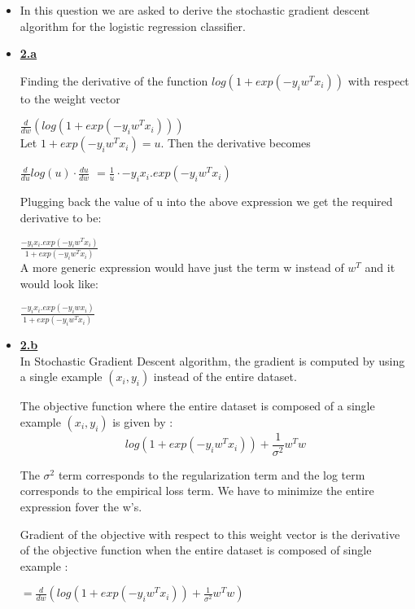 \documentclass[11pt]{article}
\begin{document}
\begin{itemize}
	\item [] In this question we are asked to derive the stochastic gradient descent algorithm for the logistic regression classifier.
	
	\item[] \textbf{\underline{2.a}}
	
	Finding the derivative of the function $log(1 + exp(-y_iw^Tx_i))$ with respect to the weight vector 
	
	$\frac{d}{dw}\left(log(1 + exp(-y_iw^Tx_i))\right)$\\
	
	Let $1 + exp(-y_iw^Tx_i) =u $. Then the derivative becomes
	
	$\frac{d}{du} log(u) \cdot \frac{du}{dw} $
	$=\frac{1}{u} \cdot -y_ix_i. exp(-y_iw^Tx_i)$
	
	Plugging back the value of u into the above expression we get the required derivative to be:
	
	$\boxed{\frac{-y_ix_i. exp(-y_iw^Tx_i)}{1 + exp(-y_iw^Tx_i)}}$\\
	
	A more generic expression would have just the term w instead of $w^T$ and it would look like:
	
		$\boxed{\frac{-y_ix_i. exp(-y_iwx_i)}{1 + exp(-y_iw^Tx_i)}}$\\
	
	\item[] \textbf{\underline{2.b}}\\
	
	In Stochastic Gradient Descent algorithm, the gradient is computed by using a single example $(x_i,y_i)$ instead of the entire dataset.
	
	The objective function where the entire dataset is composed of a single example $(x_i,y_i)$ is given by :\\
	
	$$ log(1+ exp(-y_iw^Tx_i)) + \frac{1}{\sigma^2} w^T w $$
	
	The $\sigma^2$  term corresponds to the regularization term  and the log term corresponds to the empirical loss term. We have to minimize the entire expression fover the w's.
	
	Gradient of the objective with respect to this weight vector is the derivative of the objective function when the entire dataset is composed of single example :
	
	$= \frac{d}{dw} \left(log(1+ exp(-y_iw^Tx_i)) + \frac{1}{\sigma^2} w^T w  \right) $ \\
	

\end{itemize}
\end{document}
